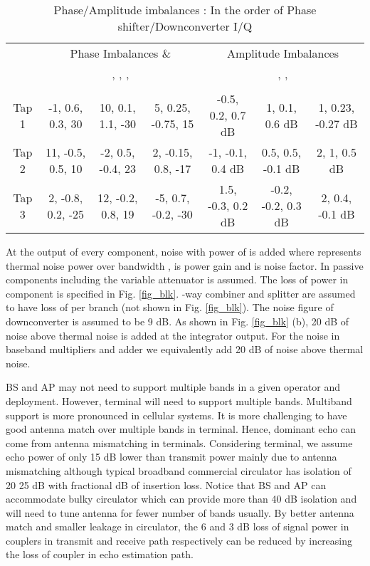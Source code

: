 \documentclass[twocolumn]{IEEEtran}
\begin{document}
\begin{center}
\begin{table*}[ht]
\centering \caption{Phase/Amplitude imbalances : In the order of
Phase shifter/Downconverter I/Q}
\begin{small}
\begin{tabular}{c||c|c|c||c|c|c}
\hline
  \hline
&\multicolumn{3}{c||}{Phase Imbalances \& }  &\multicolumn{3}{c}{Amplitude Imbalances}  \\
 &\multicolumn{3}{c||}{, , , }  &\multicolumn{3}{c}{, , }  \\
  \cline{2-7}
  &  &  &  &  &  &    \\
  \hline
  \hline
  Tap 1 & -1, 0.6, 0.3, 30 & 10, 0.1, 1.1, -30 & 5, 0.25, -0.75, 15 & -0.5, 0.2, 0.7 dB  & 1, 0.1, 0.6 dB & 1, 0.23, -0.27 dB   \\
  Tap 2 & 11, -0.5, 0.5, 10 & -2, 0.5, -0.4, 23 & 2, -0.15, 0.8, -17 & -1, -0.1, 0.4 dB  & 0.5, 0.5, -0.1 dB & 2, 1, 0.5 dB   \\
  Tap 3 & 2, -0.8, 0.2, -25 & 12, -0.2, 0.8, 19 & -5, 0.7, -0.2, -30 & 1.5, -0.3, 0.2 dB  &-0.2, -0.2, 0.3 dB & 2, 0.4, -0.1 dB   \\
  \hline
  \hline
\end{tabular}
\end{small}
\end{table*}
\end{center}
At the output of every component, noise with power of  is
added where  represents thermal noise power over bandwidth ,
 is power gain and  is noise factor. In passive components
including the variable attenuator  is assumed. The loss of
power in component is specified in Fig. \ref{fig_blk}. -way
combiner and splitter are assumed to have loss of 
per branch (not shown in Fig. \ref{fig_blk}). The noise figure of
downconverter is assumed to be 9 dB. As shown in Fig. \ref{fig_blk}
(b), 20 dB of noise above thermal noise is added at the integrator
output. For the noise in baseband multipliers and adder we
equivalently add 20 dB of noise above thermal noise.

BS and AP may not need to support multiple bands in a given operator
and deployment. However, terminal will need to support multiple
bands. Multiband support is more pronounced in cellular systems. It
is more challenging to have good antenna match over multiple bands
in terminal. Hence, dominant echo can come from antenna mismatching
in terminals. Considering terminal, we assume echo power of only 15
dB lower than transmit power mainly due to antenna mismatching
although typical broadband commercial circulator has isolation of 20
 25 dB with fractional dB of insertion loss. Notice that BS
and AP can accommodate bulky circulator which can provide more than
40 dB isolation and will need to tune antenna for fewer number of
bands usually. By better antenna match and smaller leakage in
circulator, the 6 and 3 dB loss of signal power in couplers in
transmit and receive path respectively can be reduced by increasing
the loss of coupler in echo estimation path.
\end{document}
